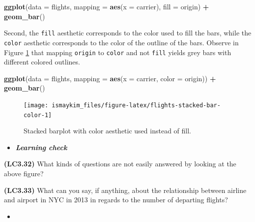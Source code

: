 \documentclass[12pt, krantz2,]{krantz}
\makeatletter
\newenvironment{Shaded}{\begin{snugshade}}{\end{snugshade}}
\newcommand{\DataTypeTok}[1]{\textcolor[rgb]{0.27,0.27,0.27}{#1}}
\newcommand{\KeywordTok}[1]{\textcolor[rgb]{0.27,0.27,0.27}{\textbf{#1}}}
\newcommand{\NormalTok}[1]{#1}
\newcommand{\OperatorTok}[1]{\textcolor[rgb]{0.43,0.43,0.43}{\textbf{#1}}}
\newcommand{\StringTok}[1]{\textcolor[rgb]{0.5,0.5,0.5}{#1}}
\newenvironment{kframe}{%
\medskip{}
\setlength{\fboxsep}{.8em}
 \def\at@end@of@kframe{}%
 \ifinner\ifhmode%
  \def\at@end@of@kframe{\end{minipage}}%
  \begin{minipage}{\columnwidth}%
 \fi\fi%
 \def\FrameCommand##1{\hskip\@totalleftmargin \hskip-\fboxsep
 \colorbox{shadecolor}{##1}\hskip-\fboxsep
     \hskip-\linewidth \hskip-\@totalleftmargin \hskip\columnwidth}%
 \MakeFramed {\advance\hsize-\width
   \@totalleftmargin\z@ \linewidth\hsize
   \@setminipage}}%
 {\par\unskip\endMakeFramed%
 \at@end@of@kframe}
\renewenvironment{Shaded}{\begin{kframe}}{\end{kframe}}
\newenvironment{rmdblock}[1]
  {\begin{shaded*}
  \begin{itemize}
  \renewcommand{\labelitemi}{
    \raisebox{-.7\height}[0pt][0pt]{
    }
  }
  \item
  }
  {
  \end{itemize}
  \end{shaded*}
  }
\newenvironment{learncheck}
  {\begin{rmdblock}{warning}}
  {\end{rmdblock}}
\makeatother
\begin{document}
\begin{Shaded}
\begin{Highlighting}[]
\KeywordTok{ggplot}\NormalTok{(}\DataTypeTok{data =}\NormalTok{ flights, }\DataTypeTok{mapping =} \KeywordTok{aes}\NormalTok{(}\DataTypeTok{x =}\NormalTok{ carrier), }\DataTypeTok{fill =}\NormalTok{ origin) }\OperatorTok{+}
\StringTok{  }\KeywordTok{geom_bar}\NormalTok{()}
\end{Highlighting}
\end{Shaded}

Second, the \texttt{fill} aesthetic corresponds to the color used to fill the bars, while the \texttt{color} aesthetic corresponds to the color of the outline of the bars. Observe in Figure \ref{fig:flights-stacked-bar-color} that mapping \texttt{origin} to \texttt{color} and not \texttt{fill} yields grey bars with different colored outlines.

\begin{Shaded}
\begin{Highlighting}[]
\KeywordTok{ggplot}\NormalTok{(}\DataTypeTok{data =}\NormalTok{ flights, }\DataTypeTok{mapping =} \KeywordTok{aes}\NormalTok{(}\DataTypeTok{x =}\NormalTok{ carrier, }\DataTypeTok{color =}\NormalTok{ origin)) }\OperatorTok{+}
\StringTok{  }\KeywordTok{geom_bar}\NormalTok{()}
\end{Highlighting}
\end{Shaded}

\begin{figure}

{\centering \texttt{[image: ismaykim\_files/figure-latex/flights-stacked-bar-color-1]} 

}

\caption{Stacked barplot with color aesthetic used instead of fill.}\label{fig:flights-stacked-bar-color}
\end{figure}

\begin{learncheck}
\textbf{\emph{Learning check}}
\end{learncheck}

\textbf{(LC3.32)} What kinds of questions are not easily answered by looking at the above figure?

\textbf{(LC3.33)} What can you say, if anything, about the relationship between airline and airport in NYC in 2013 in regards to the number of departing flights?

\begin{learncheck}

\end{learncheck}
\end{document}
